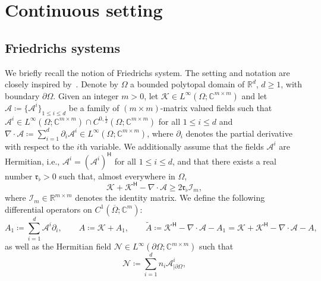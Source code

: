 \documentclass[11pt,a4paper]{article}
\theoremstyle{plain}
\theoremstyle{remark}
\theoremstyle{definition}
\newcommand{\Real}{\mathbb{R}}
\newcommand{\Complex}{\mathbb{C}}
\newcommand{\Id}[1]{\mathcal{I}_{#1}}
\newcommand{\herm}{\mathsf{H}}
\newcommand{\Kmin}{\mathfrak{r}_\flat}
\begin{document}

\section{Continuous setting}\label{sec:continuous.setting}

\subsection{Friedrichs systems}

We briefly recall the notion of Friedrichs system.
The setting and notation are closely inspired by~\cite[Chapter~1]{Ern.Guermond:21*2}.
Denote by $\Omega$ a bounded polytopal domain of $\Real^d$, $d \ge 1$, with boundary $\partial \Omega$.
Given an integer $m > 0$, let $\mathcal{K} \in L^\infty(\Omega;\Complex^{m\times m})$
and let $\mathcal{A} \coloneqq \{\mathcal{A}^i\}_{1\le i \le d}$ be a family of $(m\times m)$-matrix valued fields such that $\mathcal{A}^i \in L^\infty(\Omega;\Complex^{m\times m}) \cap C^{0,\frac12}(\Omega; \Complex^{m\times m})$ for all $1\le i\le d$ and $\nabla \cdot \mathcal{A} \coloneqq \sum_{i=1}^d \partial_i \mathcal{A}^i \in L^\infty(\Omega;\Complex^{m\times m})$, where $\partial_i$ denotes the partial derivative with respect to the $i$th variable.
We additionally assume that the fields $\mathcal{A}^i$ are Hermitian, i.e., $\mathcal{A}^i = \left( \mathcal{A}^i\right)^\herm$ for all $1 \le i \le d$, and that there exists a real number $\Kmin > 0$ such that, almost everywhere in $\Omega$,
\begin{equation}\label{eq:lower.bound.K+KH-X}
  \mathcal{K} + \mathcal{K}^\herm - \nabla \cdot \mathcal{A} \ge 2 \Kmin \Id{m},
\end{equation}
where $\mathcal{I}_m \in \Real^{m \times m}$ denotes the identity matrix.
We define the following differential operators on $C^1(\overline{\Omega};\Complex^m)$:
\begin{equation}\label{eq:A1.A.tA}
  A_1 \coloneqq \sum_{i = 1}^d \mathcal{A}^i \partial_i,\qquad
  A \coloneqq \mathcal{K} + A_1,\qquad
  \tilde{A} \coloneqq
  \mathcal{K}^\herm - \nabla \cdot \mathcal{A} - A_1
  = \mathcal{K} + \mathcal{K}^\herm - \nabla \cdot \mathcal{A} - A,
\end{equation}
as well as the Hermitian field $\mathcal{N} \in L^\infty(\partial \Omega; \Complex^{m\times m})$ such that
\begin{equation}\label{eq:NF}
  \mathcal{N} \coloneqq \sum_{i = 1}^d n_i \mathcal{A}^i_{|\partial \Omega},
\end{equation}
\end{document}
